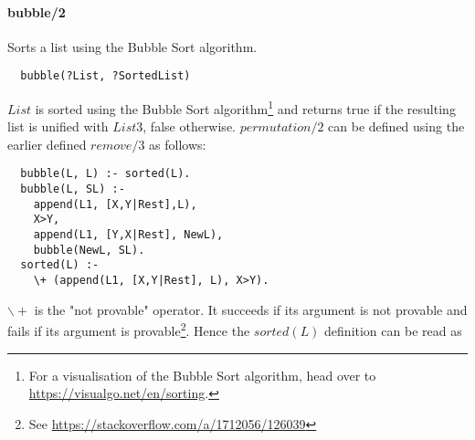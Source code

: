 \documentclass{article}
\begin{document}
\begin{multicols}{2}
  \paragraph{bubble/2} Sorts a list using the Bubble Sort algorithm.
  
  \begin{lstlisting}
  bubble(?List, ?SortedList)
  \end{lstlisting}
  
  $List$ is sorted using the Bubble Sort algorithm\footnote{For a visualisation of the Bubble Sort algorithm, head over to \href{https://visualgo.net/en/sorting}{https://visualgo.net/en/sorting}.} and returns true if the resulting list is unified with $List3$, false otherwise. $permutation/2$ can be defined using the earlier defined $remove/3$ as follows:

  \begin{lstlisting}
  bubble(L, L) :- sorted(L).
  bubble(L, SL) :-
    append(L1, [X,Y|Rest],L),
    X>Y,
    append(L1, [Y,X|Rest], NewL),
    bubble(NewL, SL).
  sorted(L) :-
    \+ (append(L1, [X,Y|Rest], L), X>Y).
  \end{lstlisting}  

  $\backslash+$ is the "not provable" operator. It succeeds if its argument is not provable and fails if its argument is provable\footnote{See \href{https://stackoverflow.com/a/1712056/126039}{https://stackoverflow.com/a/1712056/126039}}. Hence the $sorted(L)$ definition can be read as 
 
  \end{multicols}
\end{document}
